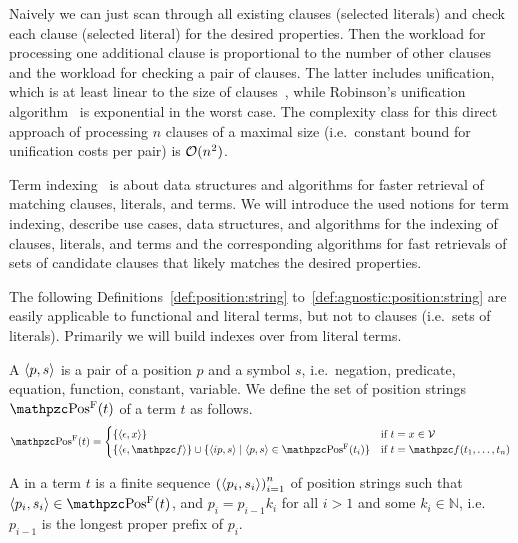 Naively we can just scan through all existing clauses (selected literals)
and check each clause (selected literal) for the desired properties.
	Then the workload for processing one additional clause is proportional to the number of other clauses and
	the workload for checking a pair of clauses.
	The latter includes unification, which is at least linear to the size of clauses~\cite{ALBERT19933},
	while Robinson's unification algorithm~\cite{Robinson:1965:MLB:321250.321253} is exponential in the worst case.
	The complexity class for this direct approach of processing \( n \) clauses of a maximal size
	(i.e.\ constant bound for unification costs per pair) is \( \mathcal{O}(n^2) \).

	Term indexing~\cite{Graf1998} is about data structures and algorithms
	for faster retrieval of matching clauses, literals, and terms.
	We will introduce the used notions for term indexing, describe
	use cases, data structures, and algorithms for the indexing
	of clauses, literals, and terms and the corresponding algorithms
	for fast retrievals of sets of candidate clauses that likely matches the desired properties.

	\begin{remark}
		The following Definitions~\ref{def:position:string} to~\ref{def:agnostic:position:string}
		are easily applicable to functional and literal terms, but not to clauses (i.e.\ sets of literals).
		Primarily we will build indexes over from literal terms.
	\end{remark}

	\begin{definition}\label{def:position:string}
		A  \( \langle p, s \rangle \)
		is a pair of a position \( p \) and a symbol \( s \),
		i.e.~negation, predicate, equation, function, constant, variable.
%
		We define the set of position strings \(\PosStr(t)\)
		of a term \( t \) as follows.
		\begin{gather*}
		\PosStr(t) =
		\begin{cases}
		\{ \ANGLES{\epsilon,x} \}
		& \text{if }t=x\in\SIGV \\
		\{ \ANGLES{\epsilon, \mcf} \} \cup \{ \ANGLES{ip,s}\mid \ANGLES{p,s} \in\PosStr(t_i)\}
		&\text{if }t=\mcf(t_1,\ldots,t_n)
		\end{cases}
		\end{gather*}
	\end{definition}



	\begin{definition}\label{def:term:path}
		A  in a term \( t \)
		is a finite sequence
		\( {( \langle p_i,s_i\rangle )}^{n}_{i=1}
			\)
		of position strings such that
		\( \ANGLES{p_i,s_i} \in \PosStr(t) \),
		and \( p_i = p_{i-1} k_i \)
		for all \( i > 1 \)
		and some \( k_i \in\mathbb{N} \),
		i.e.~\(p_{i-1}\) is the longest proper prefix of \(p_{i}\).


	\end{definition}

